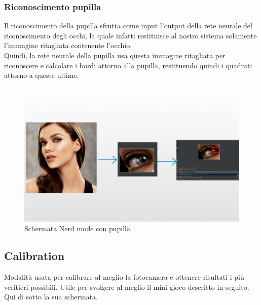 \documentclass[11pt]{article}
\begin{document}
\subsubsection{Riconoscimento pupilla}
\label{ssu:pup}
Il riconoscimento della pupilla sfrutta come input l'output della rete neurale del riconoscimento degli occhi, la quale infatti restituisce al nostro sistema solamente l'immagine ritagliata contenente l'occhio.\\ Quindi, la rete neurale della pupilla usa questa immagine ritagliata per riconoscere e calcolare i bordi attorno alla pupilla, restituendo quindi i quadrati attorno a queste ultime.
\begin{figure}[h]
\caption{Schermata Nerd mode con pupilla }
\centering
\includegraphics[scale=0.25]{img/gazeAndroid.png}
\end{figure}

\newpage
\subsection{Calibration}
\label{sub:cal}
Modalità usata per calibrare al meglio la fotocamera e ottenere risultati i più veritieri possibili. Utile per svolgere al meglio il mini gioco descritto in seguito. Qui di sotto la sua schermata.
\end{document}
